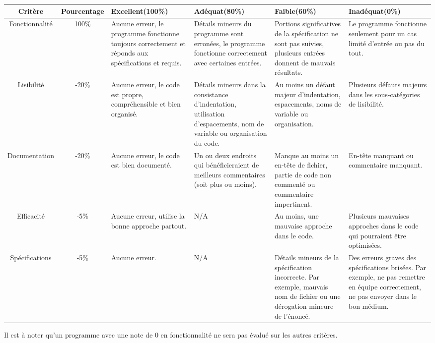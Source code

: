\begin{adjustbox}{width=0.9\paperwidth,center}
    \def\tabularxcolumn#1{m{#1}}
\begin{tabularx}{0.9\paperwidth}{ |c||c|X|X|X|X| } \hline
    Critère & Pourcentage &  Excellent(100\%) & Adéquat(80\%) & Faible(60\%) & Inadéquat(0\%) \\ \hline \hline
    Fonctionnalité & 100\% & Aucune erreur, le programme fonctionne toujours correctement et réponds aux spécifications et requis. & Détails mineurs du programme sont erronées, le programme fonctionne correctement avec certaines entrées. & Portions significatives de la spécification ne sont pas suivies, plusieurs entrées donnent de mauvais résultats. & Le programme fonctionne seulement pour un cas limité d'entrée ou pas du tout. \\ \hline
    Lisibilité & -20\% & Aucune erreur, le code est propre, compréhensible et bien organisé. & Détails mineurs dans la consistance d'indentation, utilisation d'espacements, nom de variable ou organisation du code. & Au moins un défaut majeur d'indentation, espacements, noms de variable ou organisation. & Plusieurs défauts majeurs dans les sous-catégories de lisibilité. \\ \hline
    Documentation & -20\% & Aucune erreur, le code est bien documenté. & Un ou deux endroits qui bénéficieraient de meilleurs commentaires (soit plus ou moins).
    & Manque au moins un en-tête de fichier, partie de code non commenté ou commentaire impertinent. & En-tête manquant ou commentaire manquant. \\ \hline
    Efficacité & -5\% & Aucune erreur, utilise la bonne approche partout. & N/A & Au moins, une mauvaise approche dans le code. & Plusieurs mauvaises approches dans le code qui pourraient être optimisées. \\ \hline
    Spécifications & -5\% & Aucune erreur. & N/A & Détails mineurs de la spécification incorrecte. Par exemple, mauvais nom de fichier ou une dérogation mineure de l'énoncé. & Des erreurs graves des spécifications brisées. Par exemple, ne pas remettre en équipe correctement, ne pas envoyer dans le bon médium. \\ \hline
\end{tabularx}
\end{adjustbox}
Il est à noter qu'un programme avec une note de 0 en fonctionnalité ne sera pas évalué sur les autres critères.
